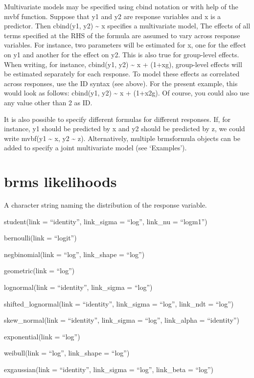 \documentclass[]{book}
\begin{document}
Multivariate models may be specified using cbind notation or with help
of the mvbf function. Suppose that y1 and y2 are response variables and
x is a predictor. Then cbind(y1, y2) \textasciitilde{} x specifies a
multivariate model, The effects of all terms specified at the RHS of the
formula are assumed to vary across response variables. For instance, two
parameters will be estimated for x, one for the effect on y1 and another
for the effect on y2. This is also true for group-level effects. When
writing, for instance, cbind(y1, y2) \textasciitilde{} x +
(1+x\textbar{}g), group-level effects will be estimated separately for
each response. To model these effects as correlated across responses,
use the ID syntax (see above). For the present example, this would look
as follows: cbind(y1, y2) \textasciitilde{} x +
(1+x\textbar{}2\textbar{}g). Of course, you could also use any value
other than 2 as ID.

It is also possible to specify different formulas for different
responses. If, for instance, y1 should be predicted by x and y2 should
be predicted by z, we could write mvbf(y1 \textasciitilde{} x, y2
\textasciitilde{} z). Alternatively, multiple brmsformula objects can be
added to specify a joint multivariate model (see `Examples').

\section{brms likelihoods}\label{brms-likelihoods}

A character string naming the distribution of the response variable.

student(link = ``identity'', link\_sigma = ``log'', link\_nu =
``logm1'')

bernoulli(link = ``logit'')

negbinomial(link = ``log'', link\_shape = ``log'')

geometric(link = ``log'')

lognormal(link = ``identity'', link\_sigma = ``log'')

shifted\_lognormal(link = ``identity'', link\_sigma = ``log'', link\_ndt
= ``log'')

skew\_normal(link = ``identity'', link\_sigma = ``log'', link\_alpha =
``identity'')

exponential(link = ``log'')

weibull(link = ``log'', link\_shape = ``log'')

exgaussian(link = ``identity'', link\_sigma = ``log'', link\_beta =
``log'')
\end{document}
